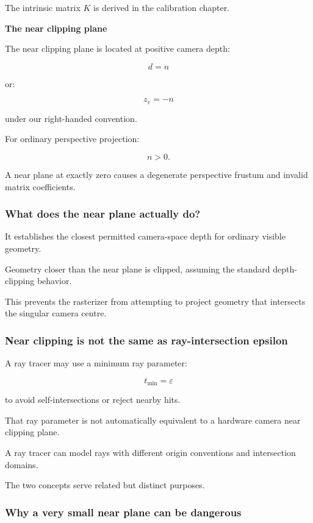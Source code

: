 The intrinsic matrix \(K\) is derived in the calibration chapter.

\textbf{The near clipping plane}

The near clipping plane is located at positive camera depth:

\[
 \boxed{d=n}
\]

or:

\[
 z_v=-n
\]

under our right-handed convention.

For ordinary perspective projection:

\[
 \boxed{n>0}.
\]

A near plane at exactly zero causes a degenerate perspective frustum and invalid matrix coefficients.

\subsubsection{What does the near plane actually do?}\label{what-does-the-near-plane-actually-do}

It establishes the closest permitted camera-space depth for ordinary visible geometry.

Geometry closer than the near plane is clipped, assuming the standard depth-clipping behavior.

This prevents the rasterizer from attempting to project geometry that intersects the singular camera centre.

\subsubsection{Near clipping is not the same as ray-intersection epsilon}\label{near-clipping-is-not-the-same-as-ray-intersection-epsilon}

A ray tracer may use a minimum ray parameter:

\[
 t_{\min}=\varepsilon
\]

to avoid self-intersections or reject nearby hits.

That ray parameter is not automatically equivalent to a hardware camera near clipping plane.

A ray tracer can model rays with different origin conventions and intersection domains.

The two concepts serve related but distinct purposes.

\subsubsection{Why a very small near plane can be dangerous}\label{why-a-very-small-near-plane-can-be-dangerous}

